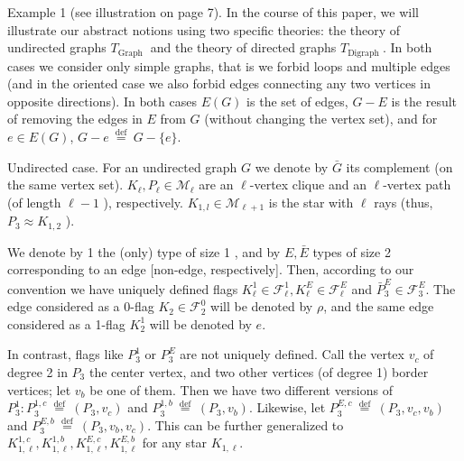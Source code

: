 \documentclass[10pt]{article}
\begin{document}
Example 1 (see illustration on page 7). In the course of this paper, we will illustrate our abstract notions using two specific theories: the theory of undirected graphs $T_{\text {Graph }}$ and the theory of directed graphs $T_{\text {Digraph }}$. In both cases we consider only simple graphs, that is we forbid loops and multiple edges (and in the oriented case we also forbid edges connecting any two vertices in opposite directions). In both cases $E(G)$ is the set of edges, $G-E$ is the result of removing the edges in $E$ from $G$ (without changing the vertex set), and for $e \in E(G)$, $G-e \stackrel{\text { def }}{=} G-\{e\}$.

Undirected case. For an undirected graph $G$ we denote by $\bar{G}$ its complement (on the same vertex set). $K_{\ell}, P_{\ell} \in \mathcal{M}_{\ell}$ are an $\ell$-vertex clique and an $\ell$-vertex path (of length $\ell-1$ ), respectively. $K_{1, l} \in \mathcal{M}_{\ell+1}$ is the star with $\ell$ rays (thus, $P_{3} \approx K_{1,2}$ ).

We denote by 1 the (only) type of size 1 , and by $E, \bar{E}$ types of size 2 corresponding to an edge [non-edge, respectively]. Then, according to our convention we have uniquely defined flags $K_{\ell}^{1} \in \mathcal{F}_{\ell}^{1}, K_{\ell}^{E} \in \mathcal{F}_{\ell}^{E}$ and $\bar{P}_{3}^{E} \in \mathcal{F}_{3}^{E}$. The edge considered as a 0-flag $K_{2} \in \mathcal{F}_{2}^{0}$ will be denoted by $\rho$, and the same edge considered as a 1-flag $K_{2}^{1}$ will be denoted by $e$.

In contrast, flags like $P_{3}^{1}$ or $P_{3}^{E}$ are not uniquely defined. Call the vertex $v_{c}$ of degree 2 in $P_{3}$ the center vertex, and two other vertices (of degree 1) border vertices; let $v_{b}$ be one of them. Then we have two different versions of $P_{3}^{1}: P_{3}^{1, c} \stackrel{\text { def }}{=}\left(P_{3}, v_{c}\right)$ and $P_{3}^{1, b} \stackrel{\text { def }}{=}\left(P_{3}, v_{b}\right)$. Likewise, let $P_{3}^{E, c} \stackrel{\text { def }}{=}\left(P_{3}, v_{c}, v_{b}\right)$ and $P_{3}^{E, b} \stackrel{\text { def }}{=}\left(P_{3}, v_{b}, v_{c}\right)$. This can be further generalized to $K_{1, \ell}^{1, c}, K_{1, \ell}^{1, b}, K_{1, \ell}^{E, c}, K_{1, \ell}^{E, b}$ for any star $K_{1, \ell}$.
\end{document}

